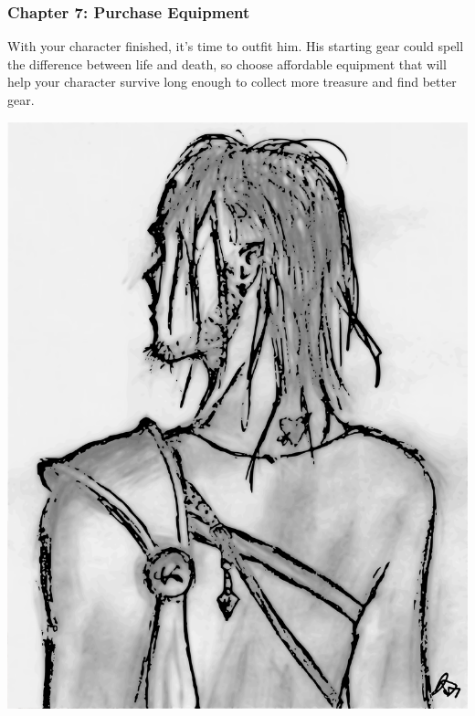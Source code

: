 \begin{multicols}{2}
\subsubsection*{Chapter 7: Purchase Equipment}
With your character finished, it's time to outfit him.  His starting gear could spell the difference between life and death, so choose affordable equipment that will help your character survive long enough to collect more treasure and find better gear.

\noindent\includegraphics[width=\columnwidth]{drothanthenovice.pdf}\label{drothanthenovice}


\end{multicols}
